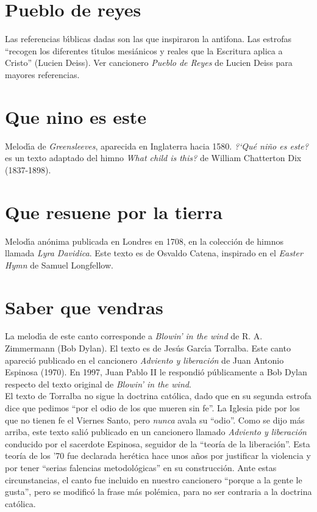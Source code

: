 \documentclass[landscape,12pt]{report}
\begin{document}
\section*{\small Pueblo de reyes} \noindent\footnotesize Las referencias b\'\i blicas dadas son las que inspiraron la ant\'\i fona. Las estrofas ``recogen los diferentes t\'\i tulos mesi\'anicos y reales que la Escritura aplica a Cristo'' (Lucien Deiss). Ver cancionero \textit{Pueblo de Reyes} de Lucien Deiss para mayores referencias.
\section*{\small Que nino es este} \noindent\footnotesize Melod\'\i a de \textit{Greensleeves}, aparecida en Inglaterra hacia 1580. \textit{?`Qu\'e ni\~no es este?} es un texto adaptado del himno \textit{What child is this?} de William Chatterton Dix (1837-1898).
\section*{\small Que resuene por la tierra} \noindent\footnotesize Melod\'\i a an\'onima publicada en Londres en 1708, en la colecci\'on de himnos llamada \textit{Lyra Davidica}. Este texto es de Osvaldo Catena, inspirado en el \textit{Easter Hymn} de Samuel Longfellow.
\section*{\small Saber que vendras} \noindent\footnotesize La melod\'\i a de este canto corresponde a \textit{Blowin' in the wind} de R. A. Zimmermann (Bob Dylan). El texto es de Jes\'us Garc\'\i a Torralba. Este canto apareci\'o publicado en el cancionero \textit{Adviento y liberaci\'on} de Juan Antonio Espinosa (1970). En 1997, Juan Pablo II le respondi\'o p\'ublicamente a Bob Dylan respecto del texto original de  \textit{Blowin' in the wind}. \\

\noindent El texto de Torralba no sigue la doctrina católica, dado que en su segunda estrofa dice que pedimos ``por el odio de los que mueren sin fe''. La Iglesia pide por los que no tienen fe el Viernes Santo, pero \emph{nunca} avala su ``odio''. Como se dijo más arriba, este texto salió publicado en un cancionero llamado \textit{Adviento y liberación} conducido por el sacerdote Espinosa, seguidor de la ``teoría de la liberación''. Esta teoría de los '70 fue declarada herética hace unos años por justificar la violencia y por tener ``serias falencias metodológicas'' en su construcción. Ante estas circunstancias, el canto fue incluido en nuestro cancionero ``porque a la gente le gusta'', pero se modificó la frase más polémica, para no ser contraria a la doctrina católica.
\end{document}
